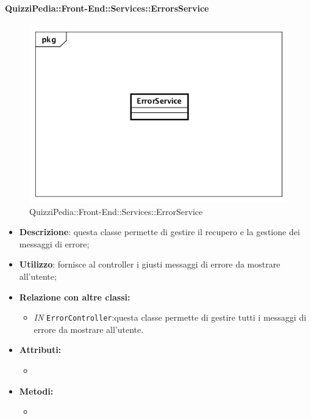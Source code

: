\paragraph{QuizziPedia::Front-End::Services::ErrorsService}
\begin{figure}
	\centering
	\includegraphics[scale=0.45]{UML/Classi/Front-End/QuizziPedia_Front-end_Services_ ErrorService.png}
	\caption{QuizziPedia::Front-End::Services::ErrorService}
\end{figure}
\begin{itemize}
	\item \textbf{Descrizione}: questa classe permette di gestire il recupero e la gestione dei messaggi di errore;
	\item \textbf{Utilizzo}: fornisce al controller i giusti messaggi di errore da mostrare all'utente;
	\item \textbf{Relazione con altre classi:}
	\begin{itemize}
		\item \textit{IN} \texttt{ErrorController}:questa classe permette di gestire tutti i messaggi di errore da mostrare all'utente. 
	\end{itemize}
	\item \textbf{Attributi:}
	\begin{itemize}
		\item 
	\end{itemize}
	\item \textbf{Metodi:}
	\begin{itemize}
		\item 
	\end{itemize}
\end{itemize}

